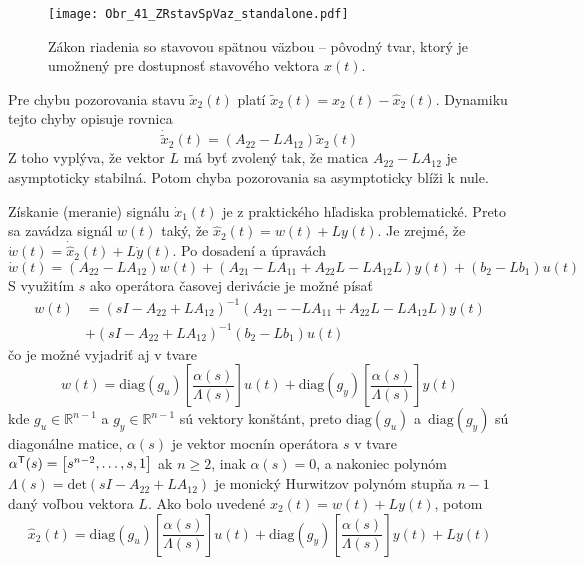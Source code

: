 \documentclass[a4paper, 10pt, ]{article}
\begin{document}
\begin{figure}[t]
    \centering
    \texttt{[image: Obr\_41\_ZRstavSpVaz\_standalone.pdf]}
    \caption{Zákon riadenia so stavovou spätnou väzbou -- pôvodný tvar, ktorý je umožnený pre dostupnosť stavového vektora $x(t)$.}
    \label{Obr_41_ZRstavSpVaz}
\end{figure}








Pre chybu pozorovania stavu $\tilde{x}_2(t)$ platí $\tilde{x}_2(t) = x_2(t) - \hat{x}_2(t)$. Dynamiku tejto chyby opisuje rovnica
\begin{equation}
	\dot{\tilde{x}}_2(t) = \left( A_{22} - L A_{12} \right) \tilde{x}_2(t)
\end{equation}
Z toho vyplýva, že vektor $L$ má byť zvolený tak, že matica $ A_{22} - L A_{12} $ je asymptoticky stabilná. Potom chyba pozorovania sa asymptoticky blíži k nule.

Získanie (meranie) signálu $\dot{x}_1(t)$ je z praktického hľadiska problematické. Preto sa zavádza signál $w(t)$ taký, že $\hat{x}_2(t) = w(t) + L y(t)$. Je zrejmé, že~$\dot{w}(t) = \dot{\hat{x}}_2(t) + L \dot{y}(t)$. Po dosadení a úpravách
\begin{equation}
	\dot{w}(t) =
	\left( A_{22} - L A_{12} \right) w(t)
	 +
	\left( A_{21} - L A_{11} + A_{22} L - L A_{12} L \right) y(t)
	 +
	\left( b_2 - L b_1 \right) u(t)
\end{equation}
S využitím $s$ ako operátora časovej derivácie je možné písať
\begin{equation}
	\begin{split}
		w(t)& =
			\left( sI - A_{22} + L A_{12} \right)^{-1}
			\left( A_{21} -  \right.   \left. - L A_{11} + A_{22} L - L A_{12} L \right) y(t)
						\\ & +
			\left( sI - A_{22} + L A_{12} \right)^{-1}
			\left( b_2 - L b_1 \right) u(t)
	\end{split}
\end{equation}
čo je možné vyjadriť aj v tvare
\begin{equation}
	w(t) =
	\text{diag}(g_u) \left[ \frac{\alpha(s)}{\Lambda(s)} \right] u(t)
	+
	\text{diag}(g_y) \left[ \frac{\alpha(s)}{\Lambda(s)} \right] y(t)
\end{equation}
kde $g_u \in \mathbb{R}^{n-1}$ a $g_y \in \mathbb{R}^{n-1}$ sú  vektory konštánt, preto $\text{diag}(g_u)$ a~$\text{diag}(g_y)$ sú diagonálne matice, $\alpha(s)$ je vektor mocnín operátora $s$ v tvare $\alpha^{\mathsf{T}}(s) = \begin{bmatrix} s^{n-2}, \ldots,s, 1 \end{bmatrix}$ ak $n\geq 2$, inak $\alpha(s) = 0$, a nakoniec polynóm $\Lambda(s) = \text{det}\left( sI - A_{22} + L A_{12} \right)$ je monický Hurwitzov polynóm stupňa $n-1$ daný voľbou vektora $L$. Ako bolo uvedené $\hat{x}_2(t) = w(t) + L y(t)$, potom
\begin{equation}
	\hat{x}_2(t) =
	\text{diag}(g_u) \left[ \frac{\alpha(s)}{\Lambda(s)} \right] u(t)
	+
	\text{diag}(g_y) \left[ \frac{\alpha(s)}{\Lambda(s)} \right] y(t)
	+ L y(t)
\end{equation}
\end{document}
